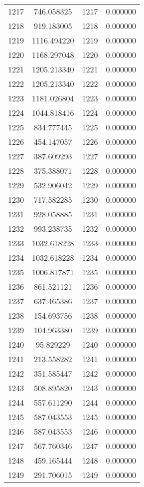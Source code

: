 \documentclass[12pt]{article}
\begin{document}
\begin{longtable}{@{}cccc@{}}
1217 & 746.058325 & 1217 & 0.000000 \\
1218 & 919.183005 & 1218 & 0.000000 \\
1219 & 1116.494220 & 1219 & 0.000000 \\
1220 & 1168.297048 & 1220 & 0.000000 \\
1221 & 1205.213340 & 1221 & 0.000000 \\
1222 & 1205.213340 & 1222 & 0.000000 \\
1223 & 1181.026804 & 1223 & 0.000000 \\
1224 & 1044.818416 & 1224 & 0.000000 \\
1225 & 834.777445 & 1225 & 0.000000 \\
1226 & 454.147057 & 1226 & 0.000000 \\
1227 & 387.609293 & 1227 & 0.000000 \\
1228 & 375.388071 & 1228 & 0.000000 \\
1229 & 532.906042 & 1229 & 0.000000 \\
1230 & 717.582285 & 1230 & 0.000000 \\
1231 & 928.058885 & 1231 & 0.000000 \\
1232 & 993.238735 & 1232 & 0.000000 \\
1233 & 1032.618228 & 1233 & 0.000000 \\
1234 & 1032.618228 & 1234 & 0.000000 \\
1235 & 1006.817871 & 1235 & 0.000000 \\
1236 & 861.521121 & 1236 & 0.000000 \\
1237 & 637.465386 & 1237 & 0.000000 \\
1238 & 154.693756 & 1238 & 0.000000 \\
1239 & 104.963380 & 1239 & 0.000000 \\
1240 & 95.829229 & 1240 & 0.000000 \\
1241 & 213.558282 & 1241 & 0.000000 \\
1242 & 351.585447 & 1242 & 0.000000 \\
1243 & 508.895820 & 1243 & 0.000000 \\
1244 & 557.611290 & 1244 & 0.000000 \\
1245 & 587.043553 & 1245 & 0.000000 \\
1246 & 587.043553 & 1246 & 0.000000 \\
1247 & 567.760346 & 1247 & 0.000000 \\
1248 & 459.165444 & 1248 & 0.000000 \\
1249 & 291.706015 & 1249 & 0.000000 \\

\end{longtable}
\end{document}
